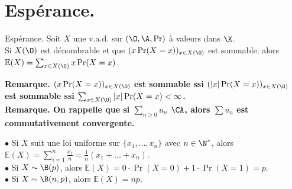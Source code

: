 \documentclass[11pt]{article}
\renewcommand*{\E}{\mathbb{E}}
\begin{document}


\vspace*{-0.8cm}

\section{Espérance.}

\begin{defi}{Espérance.}{}
    Soit $X$ une v.a.d. sur $(\O,\A,\Pr)$ à valeurs dans $\K$.\\
    Si $X(\O)$ est dénombrable et que $(x\Pr(X=x))_{x\in X(\O)}$ est sommable, alors $\E(X)=\sum_{x\in X(\O)}x\Pr(X=x)$.
\end{defi}

\vspace*{-0.8cm}

\bf{Remarque.} $(x\Pr(X=x))_{x\in X(\O)}$ est sommable ssi $(|x|\Pr(X=x))_{x\in X(\O)}$ est sommable ssi $\sum_{x\in X(\O)}|x|\Pr(X=x)<\infty$.\\
\bf{Remarque.} On rappelle que si $\sum_{n\geq 0} u_n$ $\CA$, alors $\sum u_n$ est commutativement convergente. 

\begin{ex}{}{}
    \small
    $\bullet$ Si $X$ suit une loi uniforme sur $\{x_1,...,x_n\}$ avec $n\in\N^*$, alors $\E(X)=\sum_{i=1}^n\frac{x_i}{n}=\frac{1}{n}(x_1+...+x_n)$.\\
    $\bullet$ Si $X\sim\B(p)$, alors $\E(X)=0\cdot\Pr(X=0)+1\cdot\Pr(X=1)=p$.\\
    $\bullet$ Si $X\sim\B(n,p)$, alors $\E(X)=np$.
\end{ex}

\vspace*{-0.8cm}
\end{document}
